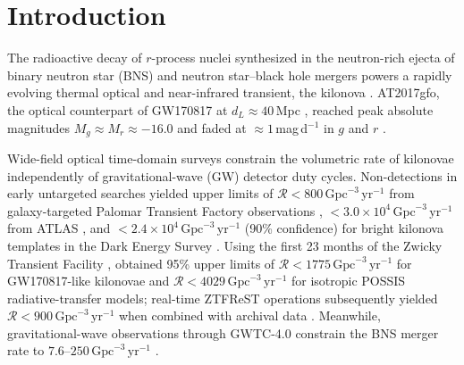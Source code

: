 \documentclass[twocolumn]{aastex631}
\newcommand{\gpcyr}{\mathrm{Gpc}^{-3}\,\mathrm{yr}^{-1}}
\begin{document}

\section{Introduction}
\label{sec:intro}

The radioactive decay of $r$-process nuclei synthesized in the neutron-rich ejecta of binary neutron star (BNS) and neutron star--black hole mergers powers a rapidly evolving thermal optical and near-infrared transient, the kilonova \citep{LiPaczynski1998, Metzger2010, Roberts2011, BarnesKasen2013, Kasen2013, TanakaHotokezaka2013, Metzger2019}. AT2017gfo, the optical counterpart of GW170817 at $d_L \approx 40$\,Mpc \citep{Abbott2017_GW170817, Abbott2017_MMA, Coulter2017, SoaresSantos2017, Arcavi2017}, reached peak absolute magnitudes $M_g \approx M_r \approx -16.0$ and faded at $\approx 1$\,mag\,d$^{-1}$ in $g$ and $r$ \citep{Drout2017, Cowperthwaite2017}.

Wide-field optical time-domain surveys constrain the volumetric rate of kilonovae independently of gravitational-wave (GW) detector duty cycles. Non-detections in early untargeted searches yielded upper limits of $\mathcal{R} < 800\,\gpcyr$ from galaxy-targeted Palomar Transient Factory observations \citep{Kasliwal2017}, $<3.0\times10^4\,\gpcyr$ from ATLAS \citep{Smartt2017}, and $<2.4\times10^4\,\gpcyr$ (90\% confidence) for bright kilonova templates in the Dark Energy Survey \citep{Doctor2017}. Using the first 23 months of the Zwicky Transient Facility \citep[ZTF;][]{Bellm2019, Graham2019, Dekany2020, Masci2019}, \citet{Andreoni2020} obtained 95\% upper limits of $\mathcal{R} < 1775\,\gpcyr$ for GW170817-like kilonovae and $\mathcal{R} < 4029\,\gpcyr$ for isotropic POSSIS radiative-transfer models; real-time ZTFReST operations subsequently yielded $\mathcal{R} < 900\,\gpcyr$ when combined with archival data \citep{Andreoni2021}. Meanwhile, gravitational-wave observations through GWTC-4.0 constrain the BNS merger rate to $7.6$--$250\,\gpcyr$ \citep[90\% credible interval;][revised from $10$--$1700\,\gpcyr$ in GWTC-3, \citealt{GWTC3pop}]{GWTC4pop}.
\end{document}
